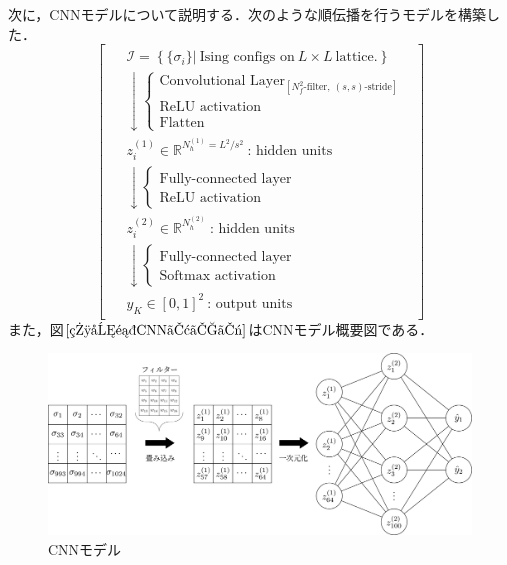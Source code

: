 \documentclass[a4paper,11pt]{jsreport}
\begin{document}
次に，CNNモデルについて説明する．次のような順伝播を行うモデルを構築した．
\begin{equation}
  \begin{bmatrix}
    \begin{aligned}
       & \mathcal{I} = \left\{ \{ \sigma_i \} \Big| \ \text{Ising configs on} \ L \times L \ \text{lattice.} \right\} \\
       & \downarrow
      \begin{cases}
        \text{Convolutional Layer}_{[N_f^2\text{-filter}, \ (s,s)\text{-stride}]} \\
        \text{ReLU activation} \\
        \text{Flatten}
      \end{cases} \\
       & z_i^{(1)} \in \mathbb{R}^{N_h^{(1)} = L^2/s^2} \ \text{: hidden units} \\
       & \downarrow
      \begin{cases}
        \text{Fully-connected layer} \\
        \text{ReLU activation}
      \end{cases} \\
       & z_i^{(2)} \in \mathbb{R}^{N_h^{(2)}} \ \text{: hidden units} \\
       & \downarrow
      \begin{cases}
        \text{Fully-connected layer} \\
        \text{Softmax activation}
      \end{cases} \\
       & y_K \in [0,1]^{2} \ \text{: output units}
    \end{aligned}
  \end{bmatrix}
\end{equation}
また，図$\ref{相分類CNNモデル}$はCNNモデル概要図である．

\begin{figure}[H]
   \begin{center}
       \includegraphics[width=\linewidth]{image/相分類CNNモデル.png}
       \caption{CNNモデル}
       \label{相分類CNNモデル}
   \end{center}
\end{figure}
\end{document}
